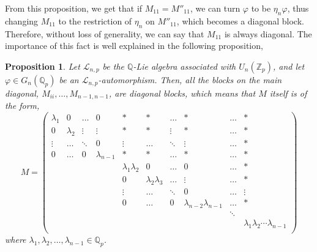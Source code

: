 \documentclass[12pt]{article}
\newtheorem{proposition}[theorem]{Proposition}
\begin{document}
From this proposition, we get that if $M_{11}=M''_{11}$, we can turn $\varphi$ to be $\eta_n\varphi$, thus changing $M_{11}$ to the restriction of $\eta_n$ on $M''_{11}$, which becomes a diagonal block. Therefore, without loss of generality, we can say that $M_{11}$ is always diagonal. The importance of this fact is well explained in the following proposition,
\begin{proposition}
\label{prop.main.diagonal.blocks}
Let $\mathcal{L}_{n,p}$ be the $\mathbb{Q}$-Lie algebra associated with $U_n(\mathbb{Z}_p)$, and let $\varphi\in G_n(\mathbb{Q}_p)$ be an $\mathcal{L}_{n,p}$-automorphism. Then, all the blocks on the main diagonal, $M_{ii},\dots,M_{n-1,n-1}$, are diagonal blocks, which means that $M$ itself is of the form,$$
M=\begin{pmatrix}
\lambda_1 & 0 & \dots & 0 & * & * & \dots & *& \dots & *\\
0 & \lambda_2 & \vdots & \vdots & * & * & \vdots & * & \dots & *\\
\vdots & \dots & \ddots & 0 & \vdots & \dots & \ddots & \vdots & \dots & *\\
0 & \dots & 0 & \lambda_{n-1} & * & * & \dots & * & \dots & *\\
& & & & \lambda_1\lambda_2 & 0 & \dots & 0 & \dots & *\\
& & & & 0 & \lambda_2\lambda_3 & \dots & \vdots & \dots & *\\
& & & & \vdots & \dots & \ddots & 0 & \dots & \vdots\\
& & & & 0 & \dots & 0 & \lambda_{n-2}\lambda_{n-1} & \dots & *\\
& & & & & & & & \ddots &\\
& & & & & & & & & \lambda_1\lambda_2\cdots\lambda_{n-1}\\
\end{pmatrix}
$$
where $\lambda_1,\lambda_2,\dots,\lambda_{n-1}\in\mathbb{Q}_p$.
\end{proposition}
\end{document}
